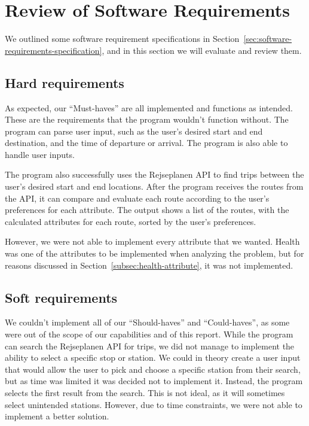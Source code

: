 \section{Review of Software Requirements}\label{sec:review-of-software-requirements}

We outlined some software requirement specifications in Section~\ref{sec:software-requirements-specification},
and in this section we will evaluate and review them.

\subsection{Hard requirements}\label{subsec:functional-requirements}

As expected, our ``Must-haves'' are all implemented and functions as intended.
These are the requirements that the program wouldn't function without.
The program can parse user input, such as the user's desired start and end destination, and the time of departure or
arrival.
The program is also able to handle user inputs.

The program also successfully uses the Rejseplanen API to find trips between the user's desired start and end locations.
After the program receives the routes from the API, it can compare and evaluate each route according to the user's
preferences for each attribute.
The output shows a list of the routes, with the calculated attributes for each route, sorted by the user's preferences.

However, we were not able to implement every attribute that we wanted.
Health was one of the attributes to be implemented when analyzing the problem, but for reasons discussed in
Section~\ref{subsec:health-attribute}, it was not implemented.

\subsection{Soft requirements}\label{subsec:non-functional-requirements}

We couldn't implement all of our ``Should-haves'' and ``Could-haves'', as some were out of the scope of our capabilities
and of this report.
While the program can search the Rejseplanen API for trips, we did not manage to implement the ability to select a
specific stop or station.
We could in theory create a user input that would allow the user to pick and choose a specific station from their
search, but as time was limited it was decided not to implement it.
Instead, the program selects the first result from the search.
This is not ideal, as it will sometimes select unintended stations.
However, due to time constraints, we were not able to implement a better solution.


